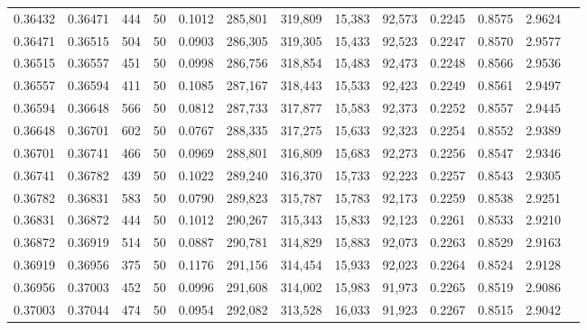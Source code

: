 \begin{tabular}{rrrrrrrrrrrrr}
0.36432 & 0.36471 &   444 &  50 &                                     0.1012 & 285,801 & 319,809 &  15,383 &  92,573 & 0.2245 & 0.8575 & 2.9624 \\
0.36471 & 0.36515 &   504 &  50 &                                     0.0903 & 286,305 & 319,305 &  15,433 &  92,523 & 0.2247 & 0.8570 & 2.9577 \\
0.36515 & 0.36557 &   451 &  50 &                                     0.0998 & 286,756 & 318,854 &  15,483 &  92,473 & 0.2248 & 0.8566 & 2.9536 \\
0.36557 & 0.36594 &   411 &  50 &                                     0.1085 & 287,167 & 318,443 &  15,533 &  92,423 & 0.2249 & 0.8561 & 2.9497 \\
0.36594 & 0.36648 &   566 &  50 &                                     0.0812 & 287,733 & 317,877 &  15,583 &  92,373 & 0.2252 & 0.8557 & 2.9445 \\
0.36648 & 0.36701 &   602 &  50 &                                     0.0767 & 288,335 & 317,275 &  15,633 &  92,323 & 0.2254 & 0.8552 & 2.9389 \\
0.36701 & 0.36741 &   466 &  50 &                                     0.0969 & 288,801 & 316,809 &  15,683 &  92,273 & 0.2256 & 0.8547 & 2.9346 \\
0.36741 & 0.36782 &   439 &  50 &                                     0.1022 & 289,240 & 316,370 &  15,733 &  92,223 & 0.2257 & 0.8543 & 2.9305 \\
0.36782 & 0.36831 &   583 &  50 &                                     0.0790 & 289,823 & 315,787 &  15,783 &  92,173 & 0.2259 & 0.8538 & 2.9251 \\
0.36831 & 0.36872 &   444 &  50 &                                     0.1012 & 290,267 & 315,343 &  15,833 &  92,123 & 0.2261 & 0.8533 & 2.9210 \\
0.36872 & 0.36919 &   514 &  50 &                                     0.0887 & 290,781 & 314,829 &  15,883 &  92,073 & 0.2263 & 0.8529 & 2.9163 \\
0.36919 & 0.36956 &   375 &  50 &                                     0.1176 & 291,156 & 314,454 &  15,933 &  92,023 & 0.2264 & 0.8524 & 2.9128 \\
0.36956 & 0.37003 &   452 &  50 &                                     0.0996 & 291,608 & 314,002 &  15,983 &  91,973 & 0.2265 & 0.8519 & 2.9086 \\
0.37003 & 0.37044 &   474 &  50 &                                     0.0954 & 292,082 & 313,528 &  16,033 &  91,923 & 0.2267 & 0.8515 & 2.9042 \\

\end{tabular}
